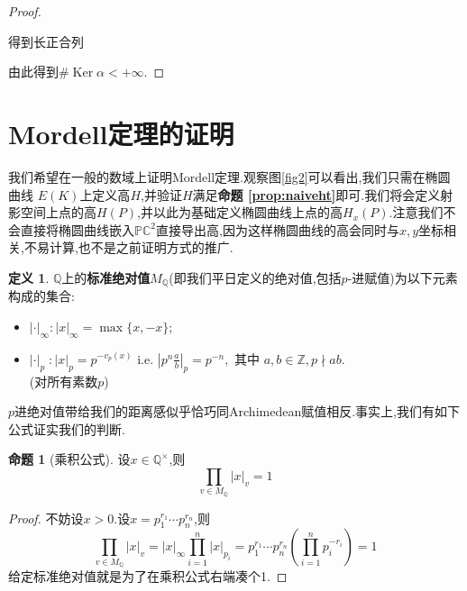 \documentclass[12pt,A4paper,oneside,reqno]{amsart}
\numberwithin{equation}{section}
\theoremstyle{definition}
\newtheorem{proposition}[theorem]{命题}
\newtheorem{defn}[theorem]{定义}
\theoremstyle{plain}
\theoremstyle{plain}
\numberwithin{equation}{section}
\theoremstyle{remark}
\DeclareMathOperator{\Ker}{\operatorname{Ker}}
\begin{document}
\begin{proof}
\begin{center}
	\end{center}	
	得到长正合列
	\begin{center}
	\end{center}	
由此得到$\#\Ker \alpha < +\infty$.
\end{proof}
\section{Mordell定理的证明}
我们希望在一般的数域上证明Mordell定理.观察图\ref{fig2}可以看出,我们只需在椭圆曲线 $E(K)$上定义高$H$,并验证$H$满足\textbf{命题 \ref{prop:naiveht}}即可.我们将会定义射影空间上点的高$H(P)$,并以此为基础定义椭圆曲线上点的高$H_x(P)$.注意我们不会直接将椭圆曲线嵌入$\mathbb{PC}^2$直接导出高,因为这样椭圆曲线的高会同时与$x,y$坐标相关,不易计算,也不是之前证明方式的推广.
\begin{defn}
	$\mathbb{Q}$上的\textbf{标准绝对值}$M_{\mathbb{Q}}$(即我们平日定义的绝对值,包括$p$-进赋值)为以下元素构成的集合:
	\begin{itemize}
		\item $\displaystyle|\cdot|_{\infty}:|x|_{\infty}=\max\{x,-x\}$;\\[-0.5cm]
		\item $\displaystyle|\cdot|_{p}\;:|x|_{p}=p^{-v_p(x)}\text{ i.e. } \left|p^n\frac{a}{b}\right|_p=p^{-n}, \text{ 其中 }a,b \in \mathbb{Z}, p \nmid ab$.\\
		(对所有素数$p$)
	\end{itemize}
\end{defn}
$p$进绝对值带给我们的距离感似乎恰巧同Archimedean赋值相反.事实上,我们有如下公式证实我们的判断.
\begin{proposition}[乘积公式]
	设$x \in \mathbb{Q}^{\times}$,则
	$$\prod_{v \in M_\mathbb{Q}}|x|_v=1$$
\end{proposition}
\begin{proof}
	不妨设$x>0$.设$x=p_1^{r_1} \cdots p_n^{r_n}$,则
	$$\prod_{v \in M_\mathbb{Q}}|x|_v=|x|_{\infty}\prod_{i=1}^{n}|x|_{p_i}=p_1^{r_1} \cdots p_n^{r_n}(\prod_{i=1}^{n} p_i^{-r_i})=1$$
	给定标准绝对值就是为了在乘积公式右端凑个1.
\end{proof}
\end{document}
